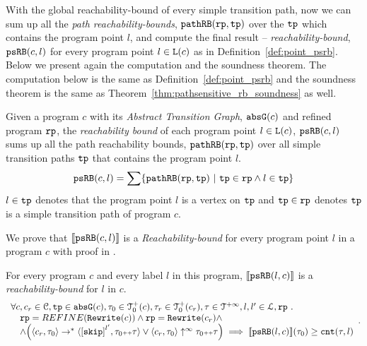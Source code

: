 With the global reachability-bound of every simple transition path, now we can sum up all the \emph{path reachability-bounds}, $\mathtt{pathRB}(\mathtt{rp}, \mathtt{tp})$ over the $\mathtt{tp}$ which contains the program point $l$, and compute the final result -- \emph{reachability-bound}, $\mathtt{psRB}(c, l)$ for every program point $l \in \mathtt{L}(c)$ as in Definition~\ref{def:point_psrb}.
Below we present again the computation and the soundness theorem.
The computation below is the same as Definition~\ref{def:point_psrb}
and the soundness theorem is the same as Theorem~\ref{thm:pathsensitive_rb_soundness} as well.
 \begin{definition}
  Given a program $c$ with its \emph{Abstract Transition Graph}, $\mathtt{abs}{\mathtt{G}}(c)$ and refined program $\mathtt{rp}$,
  the \emph{reachability bound} of each program point $l \in \mathtt{L}(c)$, $\mathtt{psRB}(c, l)$ 
  sums up all the path reachability bounds, $\mathtt{pathRB}(\mathtt{rp}, \mathtt{tp})$ over all simple transition paths $\mathtt{tp}$ that contains the program point $l$.
  \[ 
    \psRB(c, l) = 
    \sum
    \left\{ \inoutB(\rprog, \tpath) ~\vert~ \tpath \in \rprog \land 
    l \in \tpath \right\}
  \]
  $l \in \mathtt{tp}$ denotes that the program point $l$ is a vertex on $\mathtt{tp}$ 
  and $\mathtt{tp} \in \mathtt{rp}$ denotes $\mathtt{tp}$ is a simple transition path of program $c$.
 \end{definition}
We prove that $\llbracket \mathtt{psRB}(c, l) \rrbracket$ is a \emph{Reachability-bound} for every program point $l$ in a program $c$ with proof in .
\begin{theorem}
  For every program ${c}$ and every label $l$ in this program,
  $\llbracket \mathtt{psRB}(l, c) \rrbracket$ is a \emph{reachability-bound} for $l$ in $c$.
  \[
   \begin{array}{l}
   \forall c, c_r \in \cdom, \tpath \in \absG(c), \trace_0 \in \ftdom_0(c), \trace_r \in \ftdom_0(c_r), \trace \in \tdom, l, l' \in \ldom, \rprog \st 
   \\ \quad
   \rprog = REFINE(\algrewrite(c))
   \land 
   \rprog = \algrewrite(c_r)
   \land
   \\ \quad
   \land
   \Big(
   \config{c_r, \trace_0} \rightarrow^* \config{\clabel{\eskip}^{l'}, \trace_0 \tracecat \trace}
   \lor \config{c_r, \trace_0} \uparrow^{\infty} \trace_0 \tracecat \trace 
   \Big)
   \implies \econfig{\psRB(l, c)}(\trace_0) \geq \counter(\trace, l)
   \end{array}.
  \]
\end{theorem}
